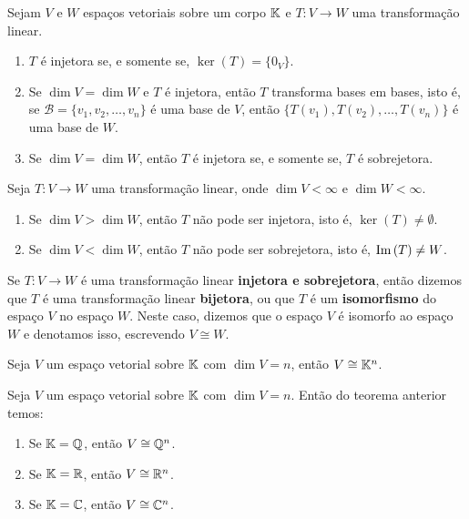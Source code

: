 \begin{proposicao}\label{caracteriza_transformacao_injetora}
    Sejam $V$ e $W$ espaços vetoriais sobre um corpo $\mathbb{K}$ e $T \colon V \to W$ uma transformação linear.
    \begin{enumerate}[label={\roman*})]
        \item $T$ é injetora se, e somente se, $\ker(T) = \{0_V\}$.

        \item Se $\dim V = \dim W$ e $T$ é injetora, então $T$ transforma bases em bases, isto é, se $\mathcal{B} = \{v_1, v_2, \dots, v_n\}$ é uma base de $V$, então $\{T(v_1), T(v_2), \dots, T(v_n)\}$ é uma base de $W$.

        \item Se $\dim V = \dim W$, então $T$ é injetora se, e somente se, $T$ é sobrejetora.
    \end{enumerate}
\end{proposicao}

\begin{observacoes}
    Seja $T \colon V \to W$ uma transformação linear, onde $\dim V < \infty$ e $\dim W < \infty$.
    \begin{enumerate}[label={\roman*})]
        \item Se $\dim V > \dim W$, então $T$ não pode ser injetora, isto é, $\ker(T) \ne \emptyset$.

        \item Se $\dim V < \dim W$, então $T$ não pode ser sobrejetora, isto é, ${\rm Im\,}(T) \ne W$.
    \end{enumerate}
\end{observacoes}

\begin{definicao}
    Se $T \colon V \to W$ é uma transformação linear \textbf{injetora e sobrejetora}, então dizemos que $T$ é uma transformação linear \textbf{bijetora}, ou que $T$ é um \textbf{isomorfismo} do espaço $V$ no espaço $W$. Neste caso, dizemos que o espaço $V$ é isomorfo ao espaço $W$ e denotamos isso, escrevendo $V \cong W$.
\end{definicao}

\begin{teorema}
    Seja $V$ um espaço vetorial sobre $\mathbb{K}$ com $\dim V = n$, então $V \cong \mathbb{K}^n$.
\end{teorema}

\begin{observacoes}
    Seja $V$ um espaço vetorial sobre $\mathbb{K}$ com $\dim V = n$. Então do teorema anterior temos:
    \begin{enumerate}[label={\roman*})]
        \item Se $\mathbb{K} = \mathbb{Q}$, então $V \cong \mathbb{Q}^n$.

        \item Se $\mathbb{K} = \mathbb{R}$, então $V \cong \mathbb{R}^n$.

        \item Se $\mathbb{K} = \mathbb{C}$, então $V \cong \mathbb{C}^n$.
    \end{enumerate}
\end{observacoes}

